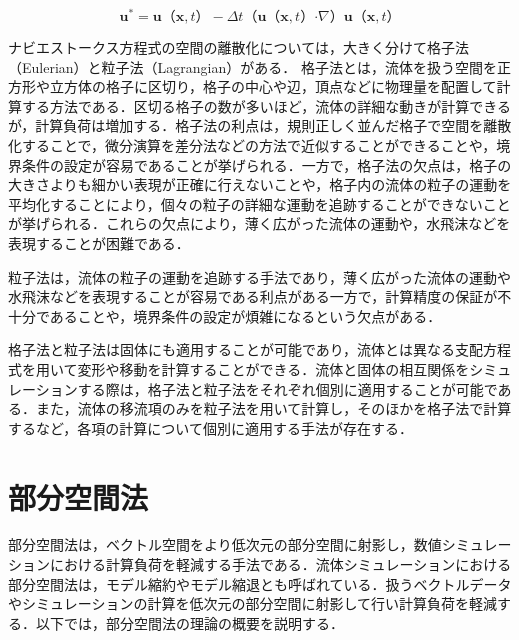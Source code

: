 \documentclass[a4j,12pt]{jreport}
\begin{document}
\begin{equation}
	\bm{u}^* = \bm{u} （\bm{x},t）  - \varDelta t （\bm{u} （\bm{x},t）  \boldsymbol{\cdot}\nabla） \bm{u} （\bm{x},t）  
\end{equation}

ナビエストークス方程式の空間の離散化については，大きく分けて格子法（Eulerian）と粒子法（Lagrangian）がある．
格子法とは，流体を扱う空間を正方形や立方体の格子に区切り，格子の中心や辺，頂点などに物理量を配置して計算する方法である．区切る格子の数が多いほど，流体の詳細な動きが計算できるが，計算負荷は増加する．格子法の利点は，規則正しく並んだ格子で空間を離散化することで，微分演算を差分法などの方法で近似することができることや，境界条件の設定が容易であることが挙げられる．一方で，格子法の欠点は，格子の大きさよりも細かい表現が正確に行えないことや，格子内の流体の粒子の運動を平均化することにより，個々の粒子の詳細な運動を追跡することができないことが挙げられる．これらの欠点により，薄く広がった流体の運動や，水飛沫などを表現することが困難である．

粒子法は，流体の粒子の運動を追跡する手法であり，薄く広がった流体の運動や水飛沫などを表現することが容易である利点がある一方で，計算精度の保証が不十分であることや，境界条件の設定が煩雑になるという欠点がある．

格子法と粒子法は固体にも適用することが可能であり，流体とは異なる支配方程式を用いて変形や移動を計算することができる．流体と固体の相互関係をシミュレーションする際は，格子法と粒子法をそれぞれ個別に適用することが可能である．また，流体の移流項のみを粒子法を用いて計算し，そのほかを格子法で計算するなど，各項の計算について個別に適用する手法が存在する．


\section{部分空間法}
	部分空間法は，ベクトル空間をより低次元の部分空間に射影し，数値シミュレーションにおける計算負荷を軽減する手法である．流体シミュレーションにおける部分空間法は，モデル縮約やモデル縮退とも呼ばれている．扱うベクトルデータやシミュレーションの計算を低次元の部分空間に射影して行い計算負荷を軽減する．以下では，部分空間法の理論の概要を説明する．
	
\end{document}
